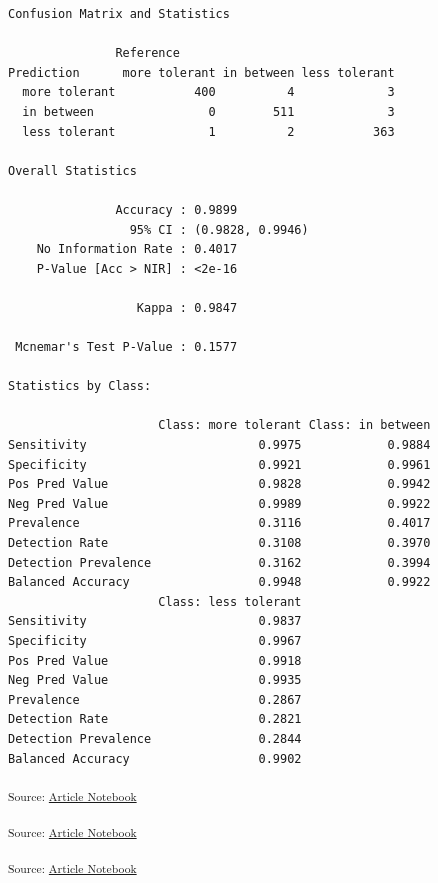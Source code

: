 \documentclass[
  letterpaper,
  DIV=11,
  numbers=noendperiod]{scrartcl}
\begin{document}
\begin{verbatim}
Confusion Matrix and Statistics

               Reference
Prediction      more tolerant in between less tolerant
  more tolerant           400          4             3
  in between                0        511             3
  less tolerant             1          2           363

Overall Statistics
                                          
               Accuracy : 0.9899          
                 95% CI : (0.9828, 0.9946)
    No Information Rate : 0.4017          
    P-Value [Acc > NIR] : <2e-16          
                                          
                  Kappa : 0.9847          
                                          
 Mcnemar's Test P-Value : 0.1577          

Statistics by Class:

                     Class: more tolerant Class: in between
Sensitivity                        0.9975            0.9884
Specificity                        0.9921            0.9961
Pos Pred Value                     0.9828            0.9942
Neg Pred Value                     0.9989            0.9922
Prevalence                         0.3116            0.4017
Detection Rate                     0.3108            0.3970
Detection Prevalence               0.3162            0.3994
Balanced Accuracy                  0.9948            0.9922
                     Class: less tolerant
Sensitivity                        0.9837
Specificity                        0.9967
Pos Pred Value                     0.9918
Neg Pred Value                     0.9935
Prevalence                         0.2867
Detection Rate                     0.2821
Detection Prevalence               0.2844
Balanced Accuracy                  0.9902
\end{verbatim}

\textsubscript{Source:
\href{https://h-christy.github.io/data-ethics-final/index.qmd.html}{Article
Notebook}}

\textsubscript{Source:
\href{https://h-christy.github.io/data-ethics-final/index.qmd.html}{Article
Notebook}}

\textsubscript{Source:
\href{https://h-christy.github.io/data-ethics-final/index.qmd.html}{Article
Notebook}}
\end{document}
